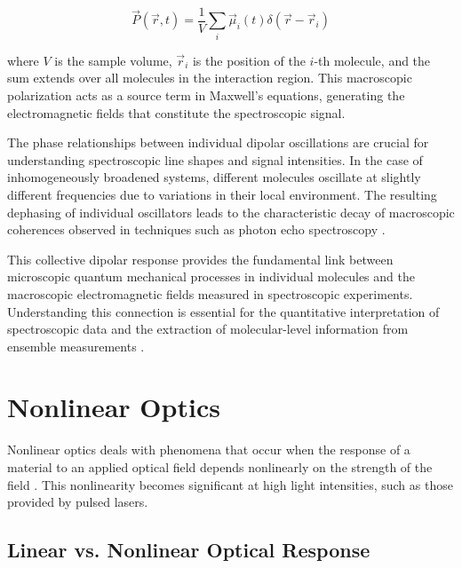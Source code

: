 \begin{equation}
	\vec{P}(\vec{r}, t) = \frac{1}{V} \sum_{i} \vec{\mu}_i(t) \delta(\vec{r} - \vec{r}_i)
	\label{eq:macroscopic_polarization}
\end{equation}

\noindent where $V$ is the sample volume, $\vec{r}_i$ is the position of the $i$-th molecule, and the sum extends over all molecules in the interaction region. This macroscopic polarization acts as a source term in Maxwell's equations, generating the electromagnetic fields that constitute the spectroscopic signal.

\noindent The phase relationships between individual dipolar oscillations are crucial for understanding spectroscopic line shapes and signal intensities. In the case of inhomogeneously broadened systems, different molecules oscillate at slightly different frequencies due to variations in their local environment. The resulting dephasing of individual oscillators leads to the characteristic decay of macroscopic coherences observed in techniques such as photon echo spectroscopy \cite{mukamel1995principlesnonlinearoptical}.

\noindent This collective dipolar response provides the fundamental link between microscopic quantum mechanical processes in individual molecules and the macroscopic electromagnetic fields measured in spectroscopic experiments. Understanding this connection is essential for the quantitative interpretation of spectroscopic data and the extraction of molecular-level information from ensemble measurements \cite{feynman1965feynmanlecturesphysics}.


\section{Nonlinear Optics}
\label{sec:nonlinear_optics}

\noindent Nonlinear optics deals with phenomena that occur when the response of a material to an applied optical field depends nonlinearly on the strength of the field \cite{boyd2008contents}. This nonlinearity becomes significant at high light intensities, such as those provided by pulsed lasers.

\subsection{Linear vs. Nonlinear Optical Response}
\label{subsec:linear_vs_nonlinear}

